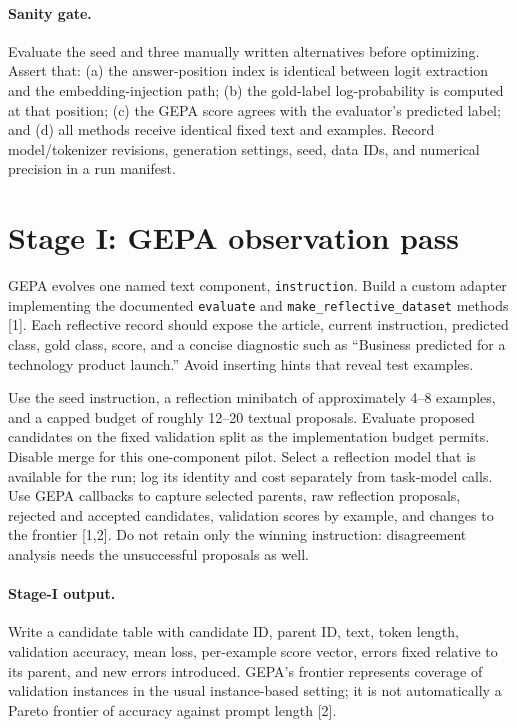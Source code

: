 \documentclass[11pt]{article}
\begin{document}
\paragraph{Sanity gate.} Evaluate the seed and three manually written alternatives before optimizing. Assert that: (a) the answer-position index is identical between logit extraction and the embedding-injection path; (b) the gold-label log-probability is computed at that position; (c) the GEPA score agrees with the evaluator's predicted label; and (d) all methods receive identical fixed text and examples. Record model/tokenizer revisions, generation settings, seed, data IDs, and numerical precision in a run manifest.

\section{Stage I: GEPA observation pass}
GEPA evolves one named text component, \texttt{instruction}. Build a custom adapter implementing the documented \texttt{evaluate} and \texttt{make\_reflective\_dataset} methods [1]. Each reflective record should expose the article, current instruction, predicted class, gold class, score, and a concise diagnostic such as ``Business predicted for a technology product launch.'' Avoid inserting hints that reveal test examples.

Use the seed instruction, a reflection minibatch of approximately 4--8 examples, and a capped budget of roughly 12--20 textual proposals. Evaluate proposed candidates on the fixed validation split as the implementation budget permits. Disable merge for this one-component pilot. Select a reflection model that is available for the run; log its identity and cost separately from task-model calls. Use GEPA callbacks to capture selected parents, raw reflection proposals, rejected and accepted candidates, validation scores by example, and changes to the frontier [1,2]. Do not retain only the winning instruction: disagreement analysis needs the unsuccessful proposals as well.

\paragraph{Stage-I output.} Write a candidate table with candidate ID, parent ID, text, token length, validation accuracy, mean loss, per-example score vector, errors fixed relative to its parent, and new errors introduced. GEPA's frontier represents coverage of validation instances in the usual instance-based setting; it is not automatically a Pareto frontier of accuracy against prompt length [2].
\end{document}
